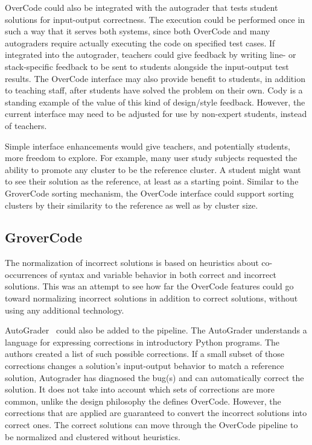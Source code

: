 OverCode could also be integrated with the autograder that tests student solutions for input-output correctness. The execution could be performed once in such a way that it serves both systems, since both OverCode and many autograders require actually executing the code on specified test cases. If integrated into the autograder, teachers could give feedback by writing line- or stack-specific feedback to be sent to students alongside the input-output test results. The OverCode interface may also provide benefit to students, in addition to teaching staff, after students have solved the problem on their own. Cody is a standing example of the value of this kind of design/style feedback. However, the current interface may need to be adjusted for use by non-expert students, instead of teachers. %

Simple interface enhancements would give teachers, and potentially students, more freedom to explore. For example, many user study subjects requested the ability to promote any cluster to be the reference cluster. A student might want to see their solution as the reference, at least as a starting point. Similar to the GroverCode sorting mechanism, the OverCode interface could support sorting clusters by their similarity to the reference as well as by cluster size. 


\subsection{GroverCode}

The normalization of incorrect solutions is based on heuristics about co-occurrences of syntax and variable behavior in both correct and incorrect solutions. This was an attempt to see how far the OverCode features could go toward normalizing incorrect solutions in addition to correct solutions, without using any additional technology. 

AutoGrader~\cite{autograder} could also be added to the pipeline. The AutoGrader understands a language for expressing corrections in introductory Python programs. The authors created a list of such possible corrections. If a small subset of those corrections changes a solution's input-output behavior to match a reference solution, Autograder has diagnosed the bug(s) and can automatically correct the solution. It does not take into account which sets of corrections are more common, unlike the design philosophy the defines OverCode. However, the corrections that are applied are guaranteed to convert the incorrect solutions into correct ones. The correct solutions can move through the OverCode pipeline to be normalized and clustered without heuristics. 

